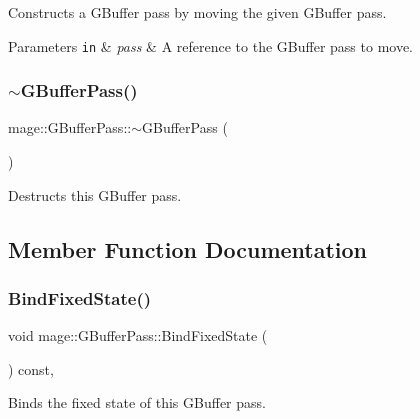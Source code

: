 Constructs a G\+Buffer pass by moving the given G\+Buffer pass.


\begin{DoxyParams}[1]{Parameters}
\mbox{\tt in}  & {\em pass} & A reference to the G\+Buffer pass to move. \\
\hline
\end{DoxyParams}
\hypertarget{classmage_1_1_g_buffer_pass_a34b2735cfb9b3546c903760f42ff770c}{}\label{classmage_1_1_g_buffer_pass_a34b2735cfb9b3546c903760f42ff770c} 
\subsubsection{\texorpdfstring{$\sim$\+G\+Buffer\+Pass()}{~GBufferPass()}}
{\footnotesize\ttfamily mage\+::\+G\+Buffer\+Pass\+::$\sim$\+G\+Buffer\+Pass (\begin{DoxyParamCaption}{ }\end{DoxyParamCaption})\hspace{0.3cm}{\ttfamily [default]}}

Destructs this G\+Buffer pass. 

\subsection{Member Function Documentation}
\hypertarget{classmage_1_1_g_buffer_pass_a40c47c900474fc47af02020ac5b04d27}{}\label{classmage_1_1_g_buffer_pass_a40c47c900474fc47af02020ac5b04d27} 
\subsubsection{\texorpdfstring{Bind\+Fixed\+State()}{BindFixedState()}}
{\footnotesize\ttfamily void mage\+::\+G\+Buffer\+Pass\+::\+Bind\+Fixed\+State (\begin{DoxyParamCaption}{ }\end{DoxyParamCaption}) const\hspace{0.3cm}{\ttfamily [private]}, {\ttfamily [noexcept]}}

Binds the fixed state of this G\+Buffer pass. \hypertarget{classmage_1_1_g_buffer_pass_a96175e27751c286737d327a4f26f01dd}{}\label{classmage_1_1_g_buffer_pass_a96175e27751c286737d327a4f26f01dd} 
